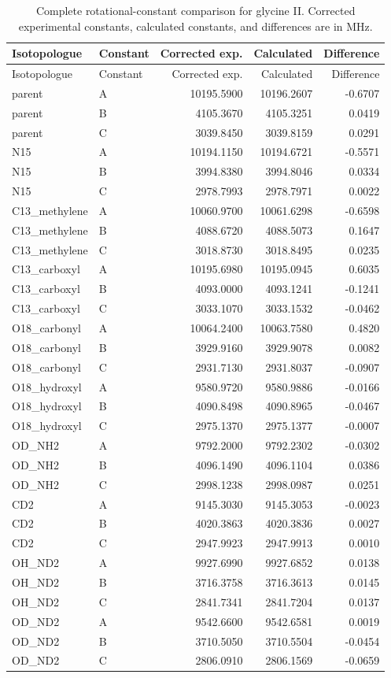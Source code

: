 \documentclass[12pt]{article}
\begin{document}
\begin{longtable}{llrrr}
\caption{Complete rotational-constant comparison for glycine II. Corrected experimental constants, calculated constants, and differences are in MHz.}\label{tab:si-glycine-rotconstants}\\
\toprule
Isotopologue & Constant & Corrected exp. & Calculated & Difference \\
\midrule
\endfirsthead
\toprule
Isotopologue & Constant & Corrected exp. & Calculated & Difference \\
\midrule
\endhead
parent & A & 10195.5900 & 10196.2607 & -0.6707 \\
parent & B & 4105.3670 & 4105.3251 & 0.0419 \\
parent & C & 3039.8450 & 3039.8159 & 0.0291 \\
N15 & A & 10194.1150 & 10194.6721 & -0.5571 \\
N15 & B & 3994.8380 & 3994.8046 & 0.0334 \\
N15 & C & 2978.7993 & 2978.7971 & 0.0022 \\
C13\_methylene & A & 10060.9700 & 10061.6298 & -0.6598 \\
C13\_methylene & B & 4088.6720 & 4088.5073 & 0.1647 \\
C13\_methylene & C & 3018.8730 & 3018.8495 & 0.0235 \\
C13\_carboxyl & A & 10195.6980 & 10195.0945 & 0.6035 \\
C13\_carboxyl & B & 4093.0000 & 4093.1241 & -0.1241 \\
C13\_carboxyl & C & 3033.1070 & 3033.1532 & -0.0462 \\
O18\_carbonyl & A & 10064.2400 & 10063.7580 & 0.4820 \\
O18\_carbonyl & B & 3929.9160 & 3929.9078 & 0.0082 \\
O18\_carbonyl & C & 2931.7130 & 2931.8037 & -0.0907 \\
O18\_hydroxyl & A & 9580.9720 & 9580.9886 & -0.0166 \\
O18\_hydroxyl & B & 4090.8498 & 4090.8965 & -0.0467 \\
O18\_hydroxyl & C & 2975.1370 & 2975.1377 & -0.0007 \\
OD\_NH2 & A & 9792.2000 & 9792.2302 & -0.0302 \\
OD\_NH2 & B & 4096.1490 & 4096.1104 & 0.0386 \\
OD\_NH2 & C & 2998.1238 & 2998.0987 & 0.0251 \\
CD2 & A & 9145.3030 & 9145.3053 & -0.0023 \\
CD2 & B & 4020.3863 & 4020.3836 & 0.0027 \\
CD2 & C & 2947.9923 & 2947.9913 & 0.0010 \\
OH\_ND2 & A & 9927.6990 & 9927.6852 & 0.0138 \\
OH\_ND2 & B & 3716.3758 & 3716.3613 & 0.0145 \\
OH\_ND2 & C & 2841.7341 & 2841.7204 & 0.0137 \\
OD\_ND2 & A & 9542.6600 & 9542.6581 & 0.0019 \\
OD\_ND2 & B & 3710.5050 & 3710.5504 & -0.0454 \\
OD\_ND2 & C & 2806.0910 & 2806.1569 & -0.0659 \\
\bottomrule
\end{longtable}
\end{document}
